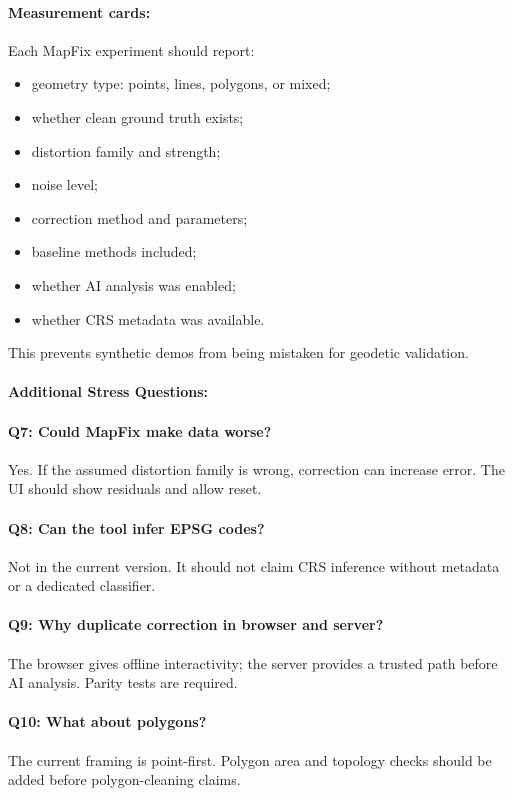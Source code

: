 \documentclass{article}
\begin{document}
\paragraph{Measurement cards:}

Each MapFix experiment should report:
\begin{itemize}
  \item geometry type: points, lines, polygons, or mixed;
  \item whether clean ground truth exists;
  \item distortion family and strength;
  \item noise level;
  \item correction method and parameters;
  \item baseline methods included;
  \item whether AI analysis was enabled;
  \item whether CRS metadata was available.
\end{itemize}
This prevents synthetic demos from being mistaken for geodetic validation.

\paragraph{Additional Stress Questions:}

\paragraph{Q7: Could MapFix make data worse?}
Yes. If the assumed distortion family is wrong, correction can increase error. The UI should show residuals and allow reset.

\paragraph{Q8: Can the tool infer EPSG codes?}
Not in the current version. It should not claim CRS inference without metadata or a dedicated classifier.

\paragraph{Q9: Why duplicate correction in browser and server?}
The browser gives offline interactivity; the server provides a trusted path before AI analysis. Parity tests are required.

\paragraph{Q10: What about polygons?}
The current framing is point-first. Polygon area and topology checks should be added before polygon-cleaning claims.
\end{document}
